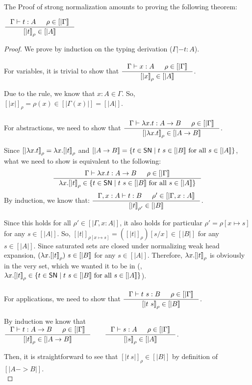 The Proof of strong normalization amounts to proving the following theorem:
\begin{theorem}
$ \inference{\Gamma|- t:A & \rho \in [|\Gamma|]}{[|t|]_\rho \in [|A|]} $
\end{theorem}
\begin{proof}
We prove by induction on the typing derivation ($\Gamma|- t:A$).
\paragraph{}
For variables, it is trivial to show that
$ \inference{\Gamma |- x:A & \rho \in [|\Gamma|]}{[|x|]_\rho \in [|A|]} $.

Due to the  rule, we know that $x:A \in \Gamma$.
So, $[|x|]_\rho =\rho(x)\in[|\Gamma(x)|] = [|A|]$.

\paragraph{}
For abstractions, we need to show that
$ \inference{\Gamma |- \l x.t : A -> B & \rho \in [|\Gamma|]}
	     {[|\l x.t|]_\rho \in [|A -> B|]} $.

Since $[|\lambda x.t|]_\rho = \lambda x.[|t|]_\rho$ and
$[|A -> B|] = \{ t\in \mathsf{SN} \mid t~s\in[|B|]~\text{for all}~s\in[|A|] \}$,
what we need to show is equivalent to the following:
\[ \inference{\Gamma |- \l x.t : A -> B & \rho \in [|\Gamma|]}
	     {\l x.[|t|]_\rho \in
		\{ t\in \SN \mid t~s\in[|B|] ~\text{for all}~ s\in[|A|] \} }
\]
By induction, we know that:
$ \inference{\Gamma,x:A |- t : B & \rho' \in [|\Gamma,x:A|]}
	     {[|t|]_{\rho'} \in [|B|]} $.

Since this holds for all $\rho' \in [|\Gamma,x:A|]$, it also holds
for particular $\rho' = \rho[x \mapsto s]$ for any $s \in [|A|]$.
So, $[|t|]_{\rho[x\mapsto s]} = ([|t|]_\rho)[s/x]\in[|B|]$ for any $s\in[|A|]$.
Since saturated sets are closed under normalizing weak head expansion,
$(\lambda x.[|t|]_\rho)~s \in[|B|]$ for any $s\in[|A|]$.
Therefore, $\lambda x.[|t|]_\rho$ is obviously in the very set,
which we wanted it to be in (\ie,
$\lambda x.[|t|]_\rho\in\{t\in \mathsf{SN} \mid t~s\in[|B|] ~\text{for all}~ s\in[|A|]\}$).

\paragraph{}
For applications, we need to show that
$ \inference{\Gamma |- t~s : B & \rho\in[|\Gamma|]}{[|t~s|]_\rho \in [|B|]} $.

By induction we know that
$
\inference{\Gamma |- t : A -> B & \rho\in[|\Gamma|]}{[|t|]_\rho \in [|A -> B|]}
\qquad
\inference{\Gamma |- s : A & \rho\in[|\Gamma|]}{[|s|]_\rho \in [|A|]}
$.

Then, it is straightforward to see that $[|t~s|]_\rho\in[|B|]$
by definition of $[|A -> B|]$.\\
\end{proof}

